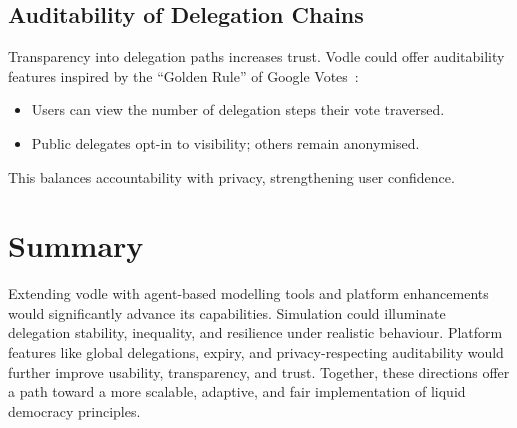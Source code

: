 \subsection{Auditability of Delegation Chains}

Transparency into delegation paths increases trust. Vodle could offer auditability features inspired by the ``Golden Rule'' of Google Votes~\citep{hardt_google_2015}:

\begin{itemize}
    \item Users can view the number of delegation steps their vote traversed.
    \item Public delegates opt-in to visibility; others remain anonymised.
\end{itemize}

This balances accountability with privacy, strengthening user confidence.

\section{Summary}

Extending vodle with agent-based modelling tools and platform enhancements would significantly advance its capabilities. Simulation could illuminate delegation stability, inequality, and resilience under realistic behaviour. Platform features like global delegations, expiry, and privacy-respecting auditability would further improve usability, transparency, and trust. Together, these directions offer a path toward a more scalable, adaptive, and fair implementation of liquid democracy principles.

